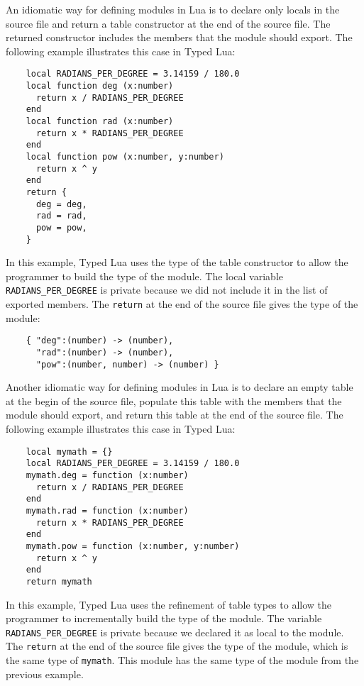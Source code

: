 An idiomatic way for defining modules in Lua is to declare only locals
in the source file and return a table constructor at the end of the source file.
The returned constructor includes the members that the module should export.
The following example illustrates this case in Typed Lua:
\begin{verbatim}
    local RADIANS_PER_DEGREE = 3.14159 / 180.0
    local function deg (x:number)
      return x / RADIANS_PER_DEGREE
    end
    local function rad (x:number)
      return x * RADIANS_PER_DEGREE
    end
    local function pow (x:number, y:number)
      return x ^ y
    end
    return {
      deg = deg,
      rad = rad,
      pow = pow,
    }
\end{verbatim}

In this example, Typed Lua uses the type of the table constructor
to allow the programmer to build the type of the module.
The local variable \texttt{RADIANS\string_PER\string_DEGREE}
is private because we did not include it in the list of exported members. 
The \texttt{return} at the end of the source file gives the type of the module:
\begin{verbatim}
    { "deg":(number) -> (number),
      "rad":(number) -> (number),
      "pow":(number, number) -> (number) }
\end{verbatim}

Another idiomatic way for defining modules in Lua is to declare an
empty table at the begin of the source file,
populate this table with the members that the module should export,
and return this table at the end of the source file. 
The following example illustrates this case in Typed Lua:
\begin{verbatim}
    local mymath = {}
    local RADIANS_PER_DEGREE = 3.14159 / 180.0
    mymath.deg = function (x:number)
      return x / RADIANS_PER_DEGREE
    end
    mymath.rad = function (x:number)
      return x * RADIANS_PER_DEGREE
    end
    mymath.pow = function (x:number, y:number)
      return x ^ y
    end
    return mymath
\end{verbatim}

In this example, Typed Lua uses the refinement of table types to
allow the programmer to incrementally build the type of the module.
The variable \texttt{RADIANS\string_PER\string_DEGREE}
is private because we declared it as local to the module. 
The \texttt{return} at the end of the source file gives the
type of the module, which is the same type of \texttt{mymath}.
This module has the same type of the module from the previous example.

